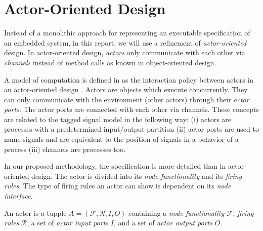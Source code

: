 
\section{Actor-Oriented Design}\label{actor-oriented-design}

Instead of a monolithic approach for representing an executable specification
of an embedded system,
in this report, we will use a refinement of \emph{actor-oriented} design.
In actor-oriented design, \emph{actors} only
communicate with each other via \emph{channels} instead of method calls as known
in object-oriented design.

A model of computation is defined in \cite{embsft:2002} as the
interaction policy between actors in an actor-oriented design
\cite{agha97abstracting:1997}. Actors are objects which execute concurrently. They can only
communicate with the environment (other actors) through their \emph{actor ports}.
The actor ports are connected with each other via channels.
These concepts are related to the tagged signal model in the following way:
(i) actors are processes with a predetermined input/output partition
(ii) actor ports are used to name signals and are equivalent to the position of signals in
a behavior of a process
(iii) channels are processes too.

In our proposed methodology, the specification is more
detailed than in actor-oriented design. The actor is divided into
its \emph{node functionality} and its \emph{firing rules}. The
type of firing rules an actor can show is dependent on its \emph{node interface}.


\begin{sdefinition}\label{actor}
An actor is a tupple $A=(\mathcal{F},\mathcal{R},I,O)$ containing
a \emph{node functionality} $\mathcal{F}$, \emph{firing rules} $\mathcal{R}$,
a set of \emph{actor input ports} $I$, and a set of \emph{actor output ports} $O$.
\end{sdefinition}

